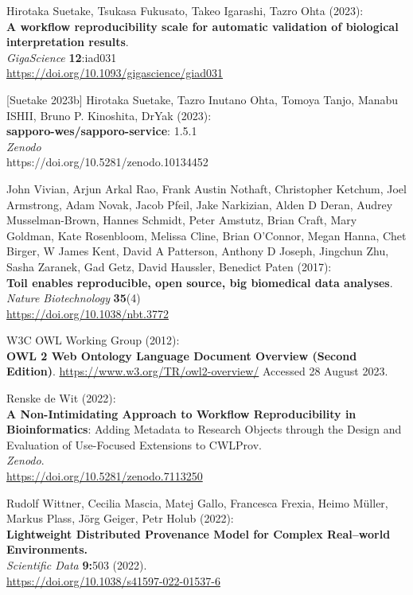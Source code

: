 \documentclass[10pt,letterpaper]{article}
\begin{document}
\begin{thebibliography}{10}
\begin{small}
 Hirotaka Suetake, Tsukasa Fukusato, Takeo Igarashi, Tazro Ohta (2023):\\
\textbf{A workflow reproducibility scale for automatic validation of biological interpretation results}.\\
\emph{GigaScience} \textbf{12}:iad031\\
\url{https://doi.org/10.1093/gigascience/giad031}

[Suetake 2023b] Hirotaka Suetake, Tazro Inutano Ohta, Tomoya Tanjo, Manabu ISHII, Bruno P. Kinoshita, DrYak (2023):\\
\textbf{sapporo-wes/sapporo-service}: 1.5.1\\
\emph{Zenodo}\\
https://doi.org/10.5281/zenodo.10134452

John Vivian, Arjun Arkal Rao, Frank Austin Nothaft, Christopher Ketchum, Joel Armstrong, Adam Novak, Jacob Pfeil, Jake Narkizian, Alden D Deran, Audrey Musselman-Brown, Hannes Schmidt, Peter Amstutz, Brian Craft, Mary Goldman, Kate Rosenbloom, Melissa Cline, Brian O'Connor, Megan Hanna, Chet Birger, W James Kent, David A Patterson, Anthony D Joseph, Jingchun Zhu, Sasha Zaranek, Gad Getz, David Haussler, Benedict Paten (2017):\\
\textbf{Toil enables reproducible, open source, big biomedical data analyses}.\\
\emph{Nature Biotechnology} \textbf{35}(4)\\
\url{https://doi.org/10.1038/nbt.3772}

W3C OWL Working Group (2012):\\
\textbf{OWL 2 Web Ontology Language Document Overview (Second Edition)}.
\url{https://www.w3.org/TR/owl2-overview/}
Accessed 28 August 2023.

Renske de Wit (2022):\\
\textbf{A Non-Intimidating Approach to Workflow Reproducibility in Bioinformatics}: Adding Metadata to Research Objects through the Design and Evaluation of Use-Focused Extensions to CWLProv.\\
\emph{Zenodo}.\\
\url{https://doi.org/10.5281/zenodo.7113250}

Rudolf Wittner, Cecilia Mascia, Matej Gallo, Francesca Frexia, Heimo Müller, Markus Plass, Jörg Geiger, Petr Holub (2022):\\
\textbf{Lightweight Distributed Provenance Model for Complex Real--world
Environments.\\
}\emph{Scientific Data} \textbf{9:}503 (2022).\\
\url{https://doi.org/10.1038/s41597-022-01537-6}


\end{small}
\end{thebibliography}
\end{document}
